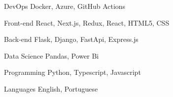 

\begin{cvskills}

  \cvskill
    {DevOps} %
    {Docker, Azure, GitHub Actions} %
    
  \cvskill
      {Front-end} %
      {React, Next.js, Redux, React, HTML5, CSS} %

  \cvskill
    {Back-end} %
    {Flask, Django, FastApi, Express.js } %

  \cvskill
    {Data Science} %
    {Pandas, Power Bi} %

  \cvskill
    {Programming} %
    {Python, Typescript, Javascript} %

  \cvskill
    {Languages} %
    {English, Portuguese} %

\end{cvskills}
